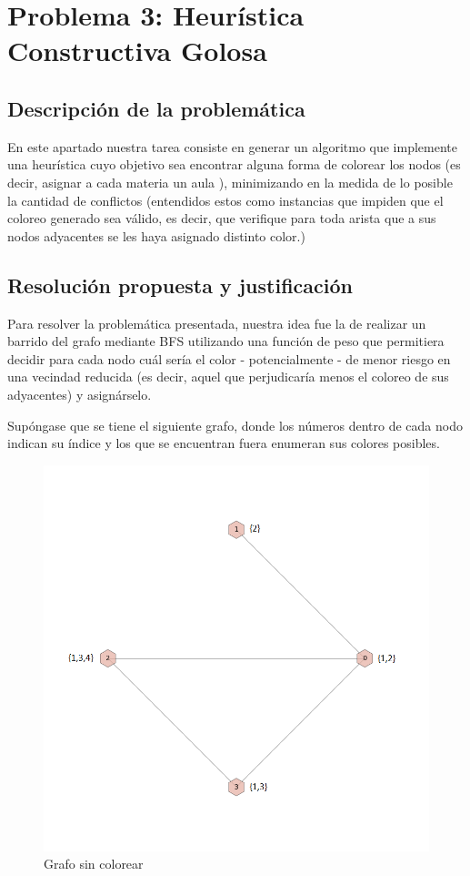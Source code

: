 \section{Problema 3: Heurística Constructiva Golosa}

\subsection{Descripción de la problemática}
En este apartado nuestra tarea consiste en generar un algoritmo que implemente una heurística cuyo objetivo sea encontrar alguna forma de colorear los nodos (es decir, asignar a cada materia un aula ), minimizando en la medida de lo posible la cantidad de conflictos (entendidos estos como instancias que impiden que el coloreo generado sea válido, es decir, que verifique para toda arista que a sus nodos adyacentes se les haya asignado distinto color.)


\subsection{Resolución propuesta y justificación}
Para resolver la problemática presentada, nuestra idea fue la de realizar un barrido del grafo mediante BFS utilizando una función de peso que permitiera decidir para cada nodo cuál sería el color - potencialmente - de menor riesgo en una vecindad reducida (es decir, aquel que perjudicaría menos el coloreo de sus adyacentes) y asignárselo.

Supóngase que se tiene el siguiente grafo, donde los números dentro de cada nodo indican su índice y los que se encuentran fuera enumeran sus colores posibles.\\

 \begin{figure}[H]
    \begin{center}
  	\includegraphics[width=13cm]{imagenes/Ej3/4Nodos0.png}
 	\caption{Grafo sin colorear}
 	\label{sinColor}
    \end{center}
  \end{figure}


